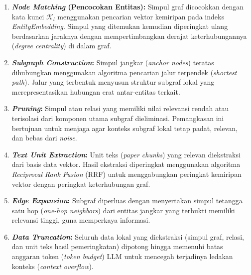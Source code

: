 \begin{enumerate}[label=\textbf{\arabic*.}, leftmargin=*, itemsep=10pt, listparindent=0.75cm]
\begin{enumerate}[label=\textbf{\alph*.}, leftmargin=*, itemsep=5pt, listparindent=0.75cm]
                    \begin{enumerate}[label=\textbf{\arabic*.}, leftmargin=*, itemsep=6pt, listparindent=0.75cm]

                        \item \textbf{\textit{Node Matching} (Pencocokan Entitas):} Simpul graf dicocokkan dengan kata kunci $\mathcal{K}_l$ menggunakan pencarian vektor kemiripan pada indeks \textit{EntityEmbedding}. Simpul yang ditemukan kemudian diperingkat ulang berdasarkan jaraknya dengan mempertimbangkan derajat keterhubungannya (\textit{degree centrality}) di dalam graf.

                        \item \textbf{\textit{Subgraph Construction}:} Simpul jangkar (\textit{anchor nodes}) teratas dihubungkan menggunakan algoritma pencarian jalur terpendek (\textit{shortest path}). Jalur yang terbentuk menyusun struktur subgraf lokal yang merepresentasikan hubungan erat antar-entitas terkait.

                        \item \textbf{\textit{Pruning}:} Simpul atau relasi yang memiliki nilai relevansi rendah atau terisolasi dari komponen utama subgraf dieliminasi. Pemangkasan ini bertujuan untuk menjaga agar konteks subgraf lokal tetap padat, relevan, dan bebas dari \textit{noise}.

                        \item \textbf{\textit{Text Unit Extraction}:} Unit teks (\textit{paper chunks}) yang relevan diekstraksi dari basis data vektor. Hasil ekstraksi diperingkat menggunakan algoritma \textit{Reciprocal Rank Fusion} (RRF) untuk menggabungkan peringkat kemiripan vektor dengan peringkat keterhubungan graf.

                        \item \textbf{\textit{Edge Expansion}:} Subgraf diperluas dengan menyertakan simpul tetangga satu hop (\textit{one-hop neighbors}) dari entitas jangkar yang terbukti memiliki relevansi tinggi, guna memperkaya informasi.

                        \item \textbf{\textit{Data Truncation}:} Seluruh data lokal yang diekstraksi (simpul graf, relasi, dan unit teks hasil pemeringkatan) dipotong hingga memenuhi batas anggaran token (\textit{token budget}) LLM untuk mencegah terjadinya ledakan konteks (\textit{context overflow}).

                    \end{enumerate}


\end{enumerate}
\end{enumerate}

